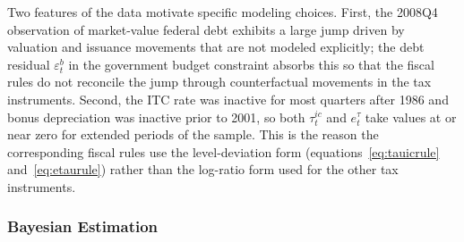 \documentclass[article,11pt,letterpaper,fleqn]{article}
\theoremstyle{definition}
\numberwithin{equation}{section}
\begin{document}
Two features of the data motivate specific modeling choices. First, the 2008Q4 observation of market-value federal debt exhibits a large jump driven by valuation and issuance movements that are not modeled explicitly; the debt residual $\varepsilon_t^b$ in the government budget constraint absorbs this so that the fiscal rules do not reconcile the jump through counterfactual movements in the tax instruments. Second, the ITC rate was inactive for most quarters after 1986 and bonus depreciation was inactive prior to 2001, so both $\tau_t^{ic}$ and $e_t^{\tau}$ take values at or near zero for extended periods of the sample. This is the reason the corresponding fiscal rules use the level-deviation form (equations~\ref{eq:tauicrule} and~\ref{eq:etaurule}) rather than the log-ratio form used for the other tax instruments.

\subsubsection{Bayesian Estimation}
\end{document}
